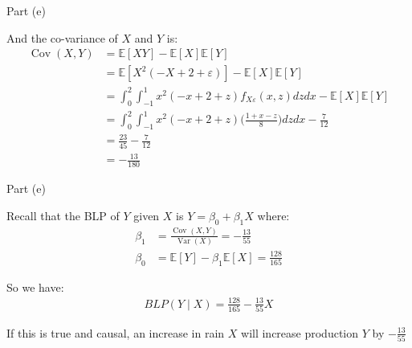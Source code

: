 \begin{frame}{Part (e)}

    And the co-variance of $X$ and $Y$ is:
    \begin{align*}
        \operatorname{Cov}(X, Y) &= \mathbb{E}[XY] - \mathbb{E}[X] \mathbb{E}[Y]
        \\
        &= \mathbb{E}[X^2(- X + 2 + \varepsilon)] - \mathbb{E}[X] \mathbb{E}[Y]
        \\
        &= \int_0^2 \int_{-1}^1 x^2(- x + 2 + z) f_{X \varepsilon} (x, z) d z dx - \mathbb{E}[X] \mathbb{E}[Y]
        \\
        &= \int_0^2 \int_{-1}^1 x^2(- x + 2 + z) \Biggr( \frac{1 + x - z}{8} \Biggr) d z dx - \frac{7}{12}
        \\
        &= \frac{23}{45} - \frac{7}{12}
        \\
        &= -\frac{13}{180}
    \end{align*}

\end{frame}

\begin{frame}{Part (e)}

    Recall that the BLP of $Y$ given $X$ is $Y = \beta_0 + \beta_1 X$ where:
    \begin{align*}
        \beta_1 &= \frac{\operatorname{Cov}(X, Y)}{\operatorname{Var}(X)} = -\frac{13}{55}
        \\
        \beta_0 &= \mathbb{E}[Y] - \beta_1 \mathbb{E}[X] = \frac{128}{165}
    \end{align*}

    So we have:
    \begin{align*}
        BLP(Y \mid X) = \frac{128}{165} - \frac{13}{55} X
    \end{align*}
    
    If this is true and causal, an increase in rain $X$ will increase production $Y$ by $-\frac{13}{55}$

\end{frame}